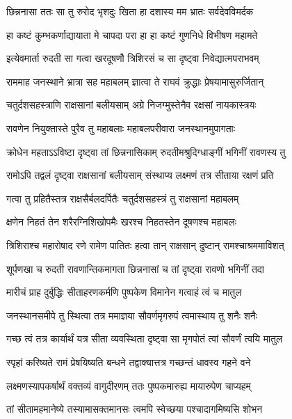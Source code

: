 \twolineshloka
{छिन्ननासा ततः सा तु रुरोद भृशदुः खिता}
{हा दशास्य मम भ्रातः सर्वदेवविमर्दक} %

\twolineshloka
{हा कष्टं कुम्भकर्णाद्यायाता मे चापदा परा}
{हा हा कष्टं गुणनिधे विभीषण महामते} %

\twolineshloka
{इत्येवमार्ता रुदती सा गत्वा खरदूषणौ}
{त्रिशिरसं च सा दृष्ट्वा निवेद्यात्मपराभवम्} %

\twolineshloka
{राममाह जनस्थाने भ्रात्रा सह महाबलम्}
{ज्ञात्वा ते राघवं क्रुद्धाः प्रेषयामासुरुर्जितान्} %

\twolineshloka
{चतुर्दशसहस्त्राणि राक्षसानां बलीयसाम्}
{अग्रे निजग्मुस्तेनैव रक्षसां नायकास्त्रयः} %

\twolineshloka
{रावणेन नियुक्तास्ते पुरैव तु महाबलाः}
{महाबलपरीवारा जनस्थानमुपागताः} %

\twolineshloka
{क्रोधेन महताऽऽविष्टा दृष्ट्वा तां छिन्ननासिकाम्}
{रुदतीमश्रुदिग्धाङ्गीं भगिनीं रावणस्य तु} %

\twolineshloka
{रामोऽपि तद्वलं दृष्ट्वा राक्षसानां बलीयसाम्}
{संस्थाप्य लक्ष्मणं तत्र सीताया रक्षणं प्रति} %

\twolineshloka
{गत्वा तु प्रहितैस्तत्र राक्षसैर्बलदर्पितैः}
{चतुर्दशसहस्त्रं तु राक्षसानां महाबलम्} %

\twolineshloka
{क्षणेन निहतं तेन शरैरग्निशिखोपमैः}
{खरश्च निहतस्तेन दूषणश्च महाबलः} %

\twolineshloka
{त्रिशिराश्च महारोषाद रणे रामेण पातितः}
{हत्वा तान् राक्षसान् दुष्टान् रामश्चाश्रममाविशत्} %

\twolineshloka
{शूर्पणखा च रुदती रावणान्तिकमागता}
{छिन्ननासां च तां दृष्ट्वा रावणो भगिनीं तदा} %

\twolineshloka
{मारीचं प्राह दुर्बुद्धिः सीताहरणकर्मणि}
{पुष्पकेण विमानेन गत्वाहं त्वं च मातुल} %

\twolineshloka
{जनस्थानसमीपे तु स्थित्वा तत्र ममाज्ञया}
{सौवर्णमृगरुपं त्वमास्थाय तु शनैः शनैः} %

\twolineshloka
{गच्छ त्वं तत्र कार्यार्थं यत्र सीता व्यवस्थिता}
{दृष्ट्वा सा मृगपोतं त्वां सौवर्णं त्वयि मातुल} %

\twolineshloka
{स्पृहां करिष्यते रामं प्रेषयिष्यति बन्धने}
{तद्वाक्यात्तत्र गच्छन्तं धावस्व गहने वने} %

\twolineshloka
{लक्ष्मणस्यापकर्षार्थं वक्तव्यं वागुदीरणम्}
{ततः पुष्पकमारुह्य मायारुपेण चाप्यहम्} %

\twolineshloka
{तां सीतामहमानेष्ये तस्यामासक्तमानसः}
{त्वमपि स्वेच्छया पश्चादागमिष्यसि शोभन} %

